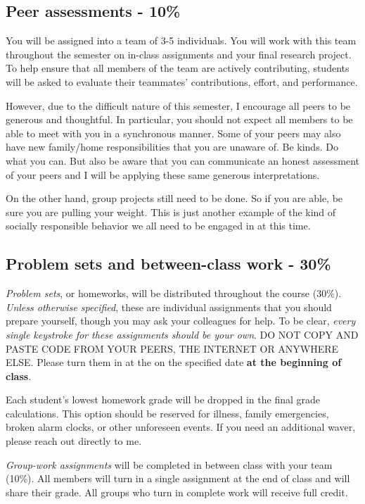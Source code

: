 \documentclass[11pt]{article}
\begin{document}
\subsection*{Peer assessments - 10\%}

You will be assigned into a team of 3-5
individuals.  You will work with this team throughout the semester on
in-class assignments and your final research project.  To help ensure
that all members of the team are actively contributing, students will
be asked to evaluate their teammates' contributions, effort, and
performance.  

However, due to the difficult nature of this semester, I encourage all peers to be generous and thoughtful.  In particular, you should not expect all members to be able to meet with you in a synchronous manner.  Some of your peers may also have new family/home responsibilities that you are unaware of.  Be kinds.  Do what you can. But also be aware that you can communicate an honest assessment of your peers and I will be applying these same generous interpretations.  

On the other hand, group projects still need to be done.  So if you are able, be sure you are pulling your weight.  This is just another example of the kind of socially responsible behavior we all need to be engaged in at this time.


\subsection*{Problem sets and between-class work - 30\%}

\noindent \textit{Problem sets}, or homeworks, will be distributed
throughout the course (30\%). \textit{Unless otherwise specified},
these are individual assignments that you should prepare yourself,
though you may ask your colleagues for help. To be clear,
\textit{every single keystroke for these assignments should be your
  own}.  DO NOT COPY AND PASTE CODE FROM YOUR PEERS, THE INTERNET OR
ANYWHERE ELSE.  Please turn them in at the on the specified date
\textbf{at the beginning of class}.

Each student's lowest homework grade will be dropped in
the final grade calculations.  This option should be reserved for
illness, family emergencies, broken alarm clocks, or other unforeseen
events.  If you need an additional waver, please reach out directly to me.

 \vspace{.4cm}
 \noindent \textit{Group-work assignments} will be completed in between class
 with your team (10\%).  All members will turn in a single assignment at
 the end of class and will share their grade. All groups who turn in complete work will receive full credit.
\end{document}
